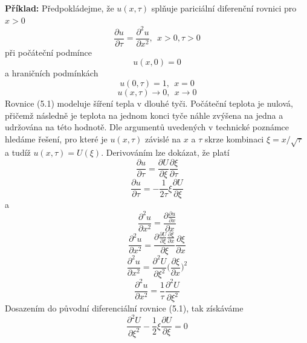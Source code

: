\documentclass[a4paper]{book}
\begin{document}
\noindent \textbf{Příklad:} Předpokládejme, že $u(x, \tau)$ splňuje pariciální diferenční rovnici pro $x > 0$
\begin{equation}
\frac{\partial u}{\partial \tau} = \frac{\partial^2 u}{\partial x^2}, ~~ x > 0, \tau > 0
\end{equation}
při počáteční podmínce
\begin{equation}
u(x, 0) = 0
\end{equation}
a hraničních podmínkách
\begin{equation}
u(0, \tau) = 1, ~~ x = 0
\end{equation}
\begin{equation}
u(x, \tau) \rightarrow 0, ~~ x \rightarrow 0
\end{equation}
Rovnice (5.1) modeluje šíření tepla v dlouhé tyči. Počáteční teplota je nulová, přičemž následně je teplota na jednom konci tyče náhle zvýšena na jedna a udržována na této hodnotě. Dle argumentů uvedených v technické poznámce hledáme řešení, pro které je $u(x, \tau)$ závislé na $x$ a $\tau$ skrze kombinaci $\xi = x / \sqrt{\tau}$ a tudíž $u(x, \tau) = U(\xi)$. Derivováním lze dokázat, že platí
\begin{equation*}
\frac{\partial u}{\partial \tau} = \frac{\partial U}{\partial \xi}\frac{\partial \xi}{\partial \tau}
\end{equation*}
\begin{equation*}
\frac{\partial u}{\partial \tau} = -\frac{1}{2 \tau} \xi \frac{\partial U}{\partial \xi}
\end{equation*}
a
\begin{equation*}
\frac{\partial^2 u}{\partial x^2} = \frac{\partial \frac{\partial u}{\partial x}}{\partial x}
\end{equation*}
\begin{equation*}
\frac{\partial^2 u}{\partial x^2} = \frac{\partial \frac{\partial U}{\partial \xi}\frac{\partial \xi}{\partial x}}{\partial \xi}\frac{\partial \xi}{\partial x}
\end{equation*}
\begin{equation*}
\frac{\partial^2 u}{\partial x^2} = \frac{\partial^2 U}{\partial \xi^2}\bigg( \frac{\partial \xi}{\partial x}\bigg)^2
\end{equation*}
\begin{equation*}
\frac{\partial^2 u}{\partial x^2} = \frac{1}{\tau}\frac{\partial^2 U}{\partial \xi^2}
\end{equation*}
Dosazením do původní diferenciální rovnice (5.1), tak získáváme
\begin{equation*}
\frac{\partial^2 U}{\partial \xi^2} - \frac{1}{2} \xi \frac{\partial U}{\partial \xi} = 0
\end{equation*}
\end{document}
